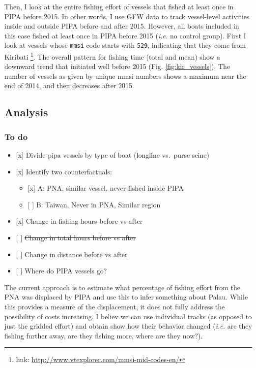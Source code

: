 \documentclass[]{article}
\providecommand{\tightlist}{%
  \setlength{\itemsep}{0pt}\setlength{\parskip}{0pt}}
\let\rmarkdownfootnote\footnote%
\def\footnote{\protect\rmarkdownfootnote}
\theoremstyle{definition}
\theoremstyle{definition}
\theoremstyle{definition}
\theoremstyle{remark}
\begin{document}
Then, I look at the entire fishing effort of vessels that fished at
least once in PIPA before 2015. In other words, I use GFW data to track
vessel-level activities inside and outside PIPA before and after 2015.
However, all boats included in this case fished at least once in PIPA
before 2015 (\emph{i.e.} no control group). First I look at vessels
whose \texttt{mmsi} code starts with \texttt{529}, indicating that they
come from Kiribati \footnote{link:
  \url{http://www.vtexplorer.com/mmsi-mid-codes-en/}}. The overall
pattern for fishing time (total and mean) show a downward trend that
initiated well before 2015 (Fig. \ref{fig:kir_vessels}). The number of
vessels as given by unique mmsi numbers shows a maximum near the end of
2014, and then decreases after 2015.

\subsection{Analysis}\label{analysis}

\subsubsection{To do}\label{to-do}

\begin{itemize}
\tightlist
\item
  {[}x{]} Divide pipa vessels by type of boat (longline vs.~purse seine)
\item
  {[}x{]} Identify two counterfactuals:

  \begin{itemize}
  \tightlist
  \item
    {[}x{]} A: PNA, similar vessel, never fished inside PIPA
  \item
    {[} {]} B: Taiwan, Never in PNA, Similar region
  \end{itemize}
\item
  {[}x{]} Change in fishing hours before vs after
\item
  {[} {]} \sout{Change in total hours before vs after}
\item
  {[} {]} Change in distance before vs after
\item
  {[} {]} Where do PIPA vessels go?
\end{itemize}

The current approach is to estimate what percentage of fishing effort
from the PNA was displaced by PIPA and use this to infer something about
Palau. While this provides a measure of the displacement, it does not
fully address the possibility of costs increasing. I believ we can use
individual tracks (as opposed to just the gridded effort) and obtain
show how their behavior changed (\emph{i.e.} are they fishing further
away, are they fishing more, where are they now?).
\end{document}
